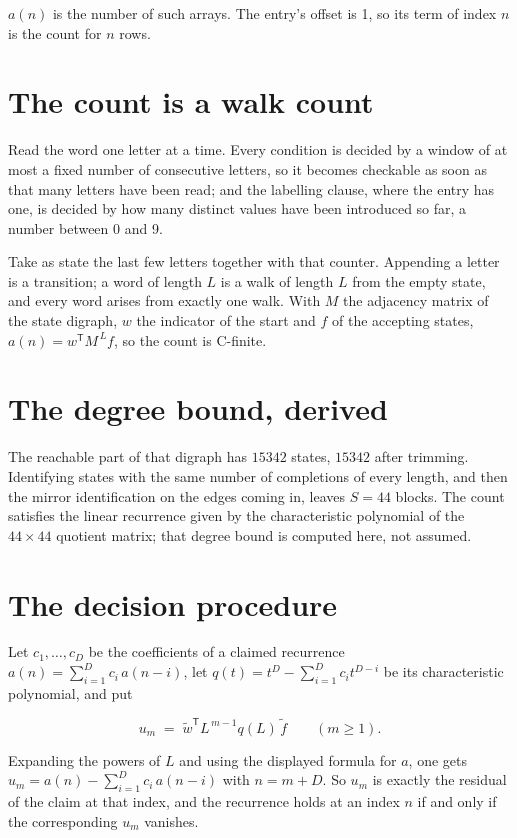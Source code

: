 \documentclass[11pt]{article}
\theoremstyle{definition}
\begin{document}
$a(n)$ is the number of such arrays. The entry's offset is 1, so its term of index $n$ is the count for $n$ rows.

\section{The count is a walk count}

Read the word one letter at a time. Every condition is decided by a window of at most a fixed number of consecutive letters, so it becomes checkable as soon as that many letters have been read; and the labelling clause, where the entry has one, is decided by how many distinct values have been introduced so far, a number between $0$ and 9.

Take as state the last few letters together with that counter. Appending a letter is a transition; a word of length $L$ is a walk of length $L$ from the empty state, and every word arises from exactly one walk. With $M$ the adjacency matrix of the state digraph, $w$ the indicator of the start and $f$ of the accepting states, $a(n) = w^{\mathsf T}M^{\,L}f$, so the count is C-finite.

\section{The degree bound, derived}

The reachable part of that digraph has $15342$ states, $15342$ after trimming. Identifying states with the same number of completions of every length, and then the mirror identification on the edges coming in, leaves $S = 44$ blocks. The count satisfies the linear recurrence given by the characteristic polynomial of the $44\times44$ quotient matrix; that degree bound is computed here, not assumed.

\section{The decision procedure}

Let $c_1,\dots,c_D$ be the coefficients of a claimed recurrence $a(n) = \sum_{i=1}^{D} c_i\,a(n-i)$, let $q(t) = t^{D} - \sum_{i=1}^{D} c_i t^{D-i}$ be its characteristic polynomial, and put

\[u_m \;=\; \tilde w^{\mathsf T} L^{\,m-1} q(L)\,\tilde f \qquad (m \ge 1).\]

Expanding the powers of $L$ and using the displayed formula for $a$, one gets $u_m = a(n) - \sum_{i=1}^{D} c_i\,a(n-i)$ with $n = m + D$. So $u_m$ is exactly the residual of the claim at that index, and the recurrence holds at an index $n$ if and only if the corresponding $u_m$ vanishes.
\end{document}
